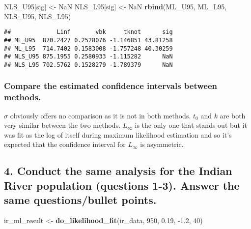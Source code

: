 \documentclass[
]{article}
\newenvironment{Shaded}{\begin{snugshade}}{\end{snugshade}}
\newcommand{\DecValTok}[1]{\textcolor[rgb]{0.00,0.00,0.81}{#1}}
\newcommand{\FloatTok}[1]{\textcolor[rgb]{0.00,0.00,0.81}{#1}}
\newcommand{\KeywordTok}[1]{\textcolor[rgb]{0.13,0.29,0.53}{\textbf{#1}}}
\newcommand{\NormalTok}[1]{#1}
\newcommand{\OtherTok}[1]{\textcolor[rgb]{0.56,0.35,0.01}{#1}}
\newcommand{\StringTok}[1]{\textcolor[rgb]{0.31,0.60,0.02}{#1}}
\begin{document}
\begin{Shaded}
\begin{Highlighting}[]
\NormalTok{NLS\_U95[}\StringTok{\textquotesingle{}sig\textquotesingle{}}\NormalTok{] \textless{}{-}}\StringTok{ }\OtherTok{NaN}
\NormalTok{NLS\_L95[}\StringTok{\textquotesingle{}sig\textquotesingle{}}\NormalTok{] \textless{}{-}}\StringTok{ }\OtherTok{NaN}
\KeywordTok{rbind}\NormalTok{(ML\_U95, ML\_L95, NLS\_U95, NLS\_L95)}
\end{Highlighting}
\end{Shaded}

\begin{verbatim}
##             Linf       vbk     tknot      sig
## ML_U95  870.2427 0.2528076 -1.146851 43.81258
## ML_L95  714.7402 0.1583008 -1.757248 40.30259
## NLS_U95 875.1955 0.2580933 -1.115282      NaN
## NLS_L95 702.5762 0.1528279 -1.789379      NaN
\end{verbatim}

\hypertarget{compare-the-estimated-confidence-intervals-between-methods.}{%
\subsubsection{Compare the estimated confidence intervals between
methods.}\label{compare-the-estimated-confidence-intervals-between-methods.}}

\(\sigma\) obviously offers no comparison as it is not in both methods.
\(t_0\) and \(k\) are both very similar between the two methods.
\(L_{\infty}\) is the only one that stands out but it was fit as the log
of itself during maximum likelihood estimation and so it's expected that
the confidence interval for \(L_{\infty}\) is asymmetric.

\hypertarget{conduct-the-same-analysis-for-the-indian-river-population-questions-1-3.-answer-the-same-questionsbullet-points.}{%
\subsection{4. Conduct the same analysis for the Indian River population
(questions 1-3). Answer the same questions/bullet
points.}\label{conduct-the-same-analysis-for-the-indian-river-population-questions-1-3.-answer-the-same-questionsbullet-points.}}

\begin{Shaded}
\begin{Highlighting}[]
\NormalTok{ir\_ml\_result \textless{}{-}}\StringTok{ }\KeywordTok{do\_likelihood\_fit}\NormalTok{(ir\_data, }\DecValTok{950}\NormalTok{, }\FloatTok{0.19}\NormalTok{, }\FloatTok{{-}1.2}\NormalTok{, }\DecValTok{40}\NormalTok{)}
\end{Highlighting}
\end{Shaded}
\end{document}
